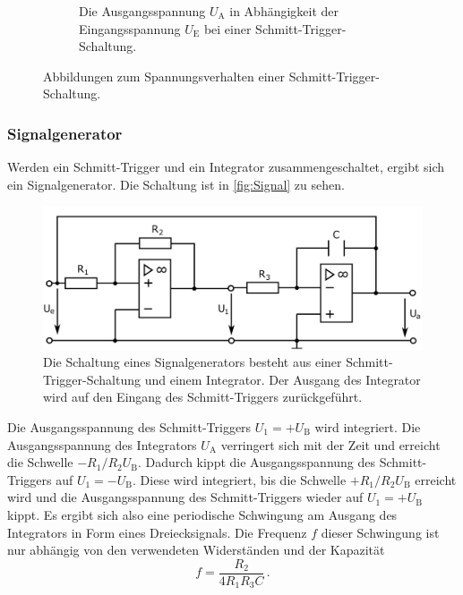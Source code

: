 \begin{figure}
\begin{subfigure}{0.48\textwidth}
        \caption{Die Ausgangsspannung $U_\text{A}$ in Abhängigkeit der Eingangsspannung $U_\text{E}$ bei einer Schmitt-Trigger-Schaltung. \cite{SchmittTrigger}}
        \label{fig:Hysterese}
    \end{subfigure}
    \caption{Abbildungen zum Spannungsverhalten einer Schmitt-Trigger-Schaltung.}
    \label{fig:Abbildung}
\end{figure}

\subsubsection{Signalgenerator}
Werden ein Schmitt-Trigger und ein Integrator zusammengeschaltet, ergibt sich ein Signalgenerator. Die Schaltung ist in \autoref{fig:Signal} zu sehen.

\begin{figure}
    \centering
    \includegraphics[width=0.7\linewidth]{./figures/5_Signal.jpeg}
    \caption{Die Schaltung eines Signalgenerators besteht aus einer Schmitt-Trigger-Schaltung und einem Integrator. Der Ausgang des Integrator wird auf den Eingang des Schmitt-Triggers zurückgeführt. \cite{V51}}
    \label{fig:Signal}
\end{figure}

Die Ausgangsspannung des Schmitt-Triggers $U_1 = + U_\text{B}$ wird integriert. Die Ausgangsspannung des Integrators $U_\text{A}$ verringert sich mit der Zeit und erreicht die Schwelle $- R_1/R_2 U_\text{B}$. Dadurch kippt die Ausgangsspannung des Schmitt-Triggers auf $U_1 = - U_\text{B}$. Diese wird integriert, bis die Schwelle $+ R_1/R_2 U_\text{B}$ erreicht wird und die Ausgangsspannung des Schmitt-Triggers wieder auf $U_1 = + U_\text{B}$ kippt. Es ergibt sich also eine periodische Schwingung am Ausgang des Integrators in Form eines Dreiecksignals. Die Frequenz $f$ dieser Schwingung ist nur abhängig von den verwendeten Widerständen und der Kapazität
\begin{equation}
    f = \frac{R_2}{4 R_1 R_3 C} \, .
    \label{eq:Frequenz}
\end{equation}









